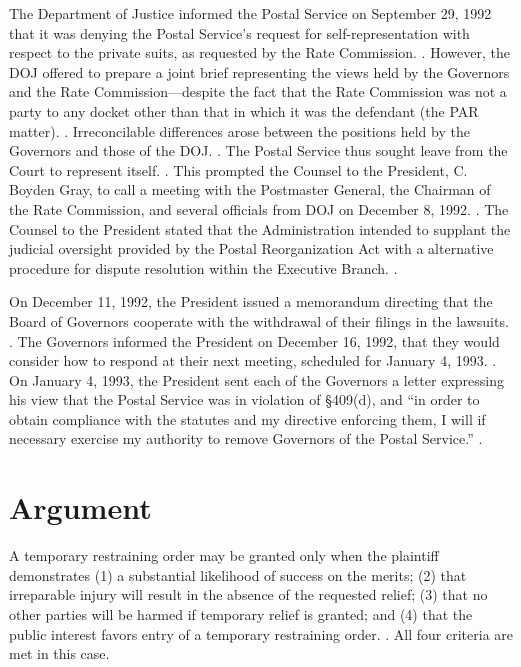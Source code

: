 \documentclass[12pt,\documentclassflag]{complaint}
\begin{document}
The Department of Justice informed the Postal Service on September 29, 1992 that it was denying the Postal Service's request for self-representation with respect to the private suits, as requested by the Rate Commission. \See \id[\P 12, Attachment B].  However, the DOJ offered to prepare a joint brief representing the views held by the Governors and the Rate Commission---despite the fact that the Rate Commission was not a party to any docket other than that in which it was the defendant (the PAR matter). \See \id[\P 13].  Irreconcilable differences arose between the positions held by the Governors and those of the DOJ. \See \id[\P 17].  The Postal Service thus sought leave from the Court to represent itself. \See \id[\P 18].  This prompted the Counsel to the President, C. Boyden Gray, to call a meeting with the Postmaster General, the Chairman of the Rate Commission, and several officials from DOJ on December 8, 1992. \See \id[\P 20].  The Counsel to the President stated that the Administration intended to supplant the judicial oversight provided by the Postal Reorganization Act with a alternative procedure for dispute resolution within the Executive Branch. \See \id[\P 22, Attachment J].

On December 11, 1992, the President issued a memorandum directing that the Board of Governors cooperate with the withdrawal of their filings in the lawsuits. \See \id[\P 23, Attachment K]. The Governors informed the President on December 16, 1992, that they would consider how to respond at their next meeting, scheduled for January 4, 1993.  \See \id[\P 24, Attachment M].  On January 4, 1993, the President sent each of the Governors a letter expressing his view that the Postal Service was in violation of \S409(d), and ``in order to obtain compliance with the statutes and my directive enforcing them, I will if necessary exercise my authority to remove Governors of the Postal Service.'' \See {}.

\section{Argument}

A temporary restraining order may be granted only when the plaintiff demonstrates (1) a substantial likelihood of success on the merits; (2) that irreparable injury will result in the absence of the requested relief; (3) that no other parties will be harmed if temporary relief is granted; and (4) that the public interest favors entry of a temporary restraining order. .  All four criteria are met in this case.
\end{document}
